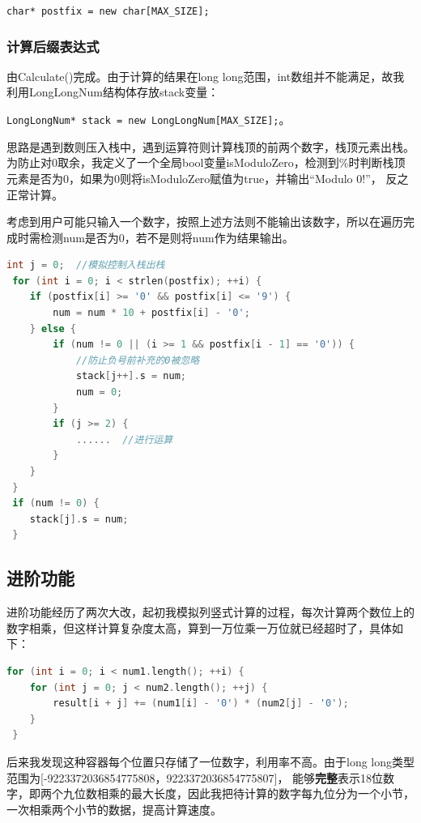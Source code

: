 \documentclass[a4paper, 11pt, UTF8]{ctexart}
\begin{document}
\verb|char* postfix = new char[MAX_SIZE];|

\subsubsection{计算后缀表达式}

由Calculate()完成。由于计算的结果在long long范围，int数组并不能满足，故我利用LongLongNum结构体存放stack变量：

\verb|LongLongNum* stack = new LongLongNum[MAX_SIZE];|。

思路是遇到数则压入栈中，遇到运算符则计算栈顶的前两个数字，栈顶元素出栈。
为防止对0取余，我定义了一个全局bool变量isModuloZero，检测到\%时判断栈顶元素是否为0，如果为0则将isModuloZero赋值为true，并输出“Modulo 0!”，
反之正常计算。

考虑到用户可能只输入一个数字，按照上述方法则不能输出该数字，所以在遍历完成时需检测num是否为0，若不是则将num作为结果输出。

\begin{lstlisting}[language=C++, basicstyle=\ttfamily]
 int j = 0;  //模拟控制入栈出栈
 for (int i = 0; i < strlen(postfix); ++i) {
    if (postfix[i] >= '0' && postfix[i] <= '9') {
        num = num * 10 + postfix[i] - '0';
    } else {
        if (num != 0 || (i >= 1 && postfix[i - 1] == '0')) {
            //防止负号前补充的0被忽略
            stack[j++].s = num;
            num = 0;
        }
        if (j >= 2) {
            ......  //进行运算
        }
    }
 }
 if (num != 0) {
    stack[j].s = num;
 }
\end{lstlisting}

\subsection{进阶功能}

进阶功能经历了两次大改，起初我模拟列竖式计算的过程，每次计算两个数位上的数字相乘，但这样计算复杂度太高，算到一万位乘一万位就已经超时了，具体如下：

\begin{lstlisting}[language=C++, basicstyle=\ttfamily]
 for (int i = 0; i < num1.length(); ++i) {
    for (int j = 0; j < num2.length(); ++j) {
        result[i + j] += (num1[i] - '0') * (num2[j] - '0');
    }
 }
\end{lstlisting}

后来我发现这种容器每个位置只存储了一位数字，利用率不高。由于long long类型范围为[-9223372036854775808，9223372036854775807]，
能够\textbf{完整}表示18位数字，即两个九位数相乘的最大长度，因此我把待计算的数字每九位分为一个小节，一次相乘两个小节的数据，提高计算速度。
\end{document}
